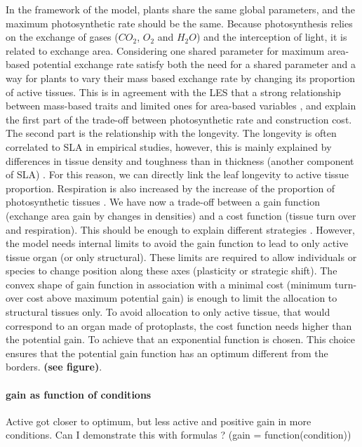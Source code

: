 In the framework of the model, plants share the same global parameters, and the maximum photosynthetic rate should be the same. Because photosynthesis relies on the exchange of gases ($CO_2$, $O_2$ and $H_2O$) and the interception of light, it is related to exchange area. Considering one shared parameter for maximum area-based potential exchange rate satisfy both the need for a shared parameter and a way for plants to vary their mass based exchange rate by changing its proportion of active tissues. This is in agreement with the LES that a strong relationship between mass-based traits and limited ones for area-based variables \cite{wright_worldwide_2004}, and explain the first part of the trade-off between photosynthetic rate and construction cost. The second part is the relationship with the longevity. The longevity is often correlated to SLA in empirical studies, however, this is mainly explained by differences in tissue density and toughness than in thickness (another component of SLA) \cite{}. For this reason, we can directly link the leaf longevity to active tissue proportion. Respiration is also increased by the increase of the proportion of photosynthetic tissues \cite{kleidon, reich}. We have now a trade-off between a gain function (exchange area gain by changes in densities) and a cost function (tissue turn over and respiration). This should be enough to explain different strategies \cite{westoby}. However, the model needs internal limits to avoid the gain function to lead to only active tissue organ (or only structural). These limits are required to allow individuals or species to change position along these axes (plasticity or strategic shift). The convex shape of gain function in association with a minimal cost (minimum turn-over cost above maximum potential gain) is enough to limit the allocation to structural tissues only. To avoid allocation to only active tissue, that would correspond to an organ made of protoplasts, the cost function needs higher than the potential gain. To achieve that an exponential function is chosen. This choice ensures that the potential gain function has an optimum different from the borders. \textbf{(see figure)}.\\

\paragraph{gain as function of conditions}
Active got closer to optimum, but less active and positive gain in more conditions. Can I demonstrate this with formulas ? (gain = function(condition))
\\

